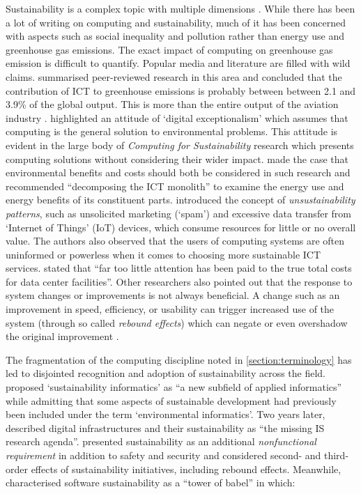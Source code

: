 Sustainability is a complex topic with multiple dimensions \citep{UnitedNations2015}. While there has been a lot of writing on computing and sustainability, much of it has been concerned with aspects such as social inequality and pollution \citep{Hilty2011a} rather than energy use and greenhouse gas emissions. The exact impact of computing on greenhouse gas emission is difficult to quantify. Popular media and literature are filled with wild claims. \citet{Freitag2021} summarised peer-reviewed research in this area and concluded that the contribution of ICT to greenhouse emissions is probably between between 2.1 and 3.9\% of the global output. This is more than the entire output of the aviation industry \citep{EESI2022}. \citet{Knowles2022} highlighted an attitude of `digital exceptionalism' which assumes that computing is the general solution to environmental problems. This attitude is evident in the large body of \emph{Computing for Sustainability} research which presents computing solutions without considering their wider impact. \citet{Coroama2009} made the case that environmental benefits and costs should both be considered in such research and recommended \enquote{decomposing the ICT monolith} to examine the energy use and energy benefits of its constituent parts. \citet{Tocze2022a} introduced the concept of \emph{unsustainability patterns}, such as unsolicited marketing (`spam') and excessive data transfer from `Internet of Things' (IoT) devices, which consume resources for little or no overall value. The authors also observed that the users of computing systems are often uninformed or powerless when it comes to choosing more sustainable ICT services. \citet{Koomey2009} stated that \enquote{far too little attention has been paid to the true total costs for data center facilities}. Other researchers also pointed out that the response to system changes or improvements is not always beneficial. A change such as an improvement in speed, efficiency, or usability can trigger increased use of the system (through so called \emph{rebound effects}) which can negate or even overshadow the original improvement \citep{Hilty2006} \citep{Gossart2015} \citep{Adelmeyer2017}.

The fragmentation of the computing discipline noted in \autoref{section:terminology} has led to disjointed recognition and adoption of sustainability across the field. \citet{Naumann2008} proposed `sustainability informatics' as \enquote{a new subfield of applied informatics} while admitting that some aspects of sustainable development had previously been included under the term `environmental informatics'. Two years later, \citet{Tilson2010} described digital infrastructures and their sustainability as \enquote{the missing IS research agenda}.  \citet{Penzenstadler2014} presented sustainability as an additional \emph{nonfunctional requirement} in addition to safety and security and considered second- and third-order effects of sustainability initiatives, including rebound effects. Meanwhile, \citet{Venters2014} characterised software sustainability as a \enquote{tower of babel} in which:

